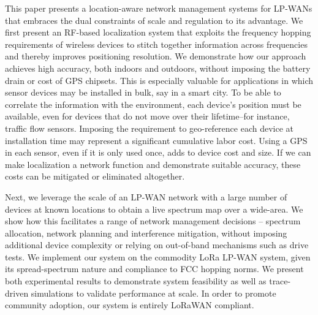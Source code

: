 

This paper presents a location-aware network management systems for LP-WANs that embraces the dual constraints of scale and regulation to its advantage. We first present an RF-based localization system that exploits the frequency hopping requirements of wireless devices to stitch together information across frequencies and thereby improves positioning resolution. We demonstrate how our approach achieves high accuracy, both indoors and outdoors, without imposing the battery drain or cost of GPS chipsets.  This is especially valuable for applications in which sensor devices may be installed in bulk, say in a smart city.  To be able to correlate the information with the environment, each device's position must be available, even for devices that do not move over their lifetime--for instance, traffic flow sensors.  Imposing the requirement to geo-reference each device at installation time may represent a significant cumulative labor cost.  Using a GPS in each sensor, even if it is only used once, adds to device cost and size.  If we can make localization a network function and demonstrate suitable accuracy, these costs can be mitigated or eliminated altogether.  

Next, we leverage the  scale of an LP-WAN network with a large number of devices at known locations to obtain a live spectrum map over a wide-area. We show how this facilitates a range of network management decisions -- spectrum allocation, network planning and interference mitigation, without imposing additional device complexity or relying on out-of-band mechanisms such as drive tests. We implement our system on the commodity LoRa LP-WAN system, given its spread-spectrum nature and compliance to FCC hopping norms. We present both experimental results to demonstrate system feasibility as well as trace-driven simulations to validate performance at scale. In order to promote community adoption,  our system is entirely LoRaWAN compliant. 


